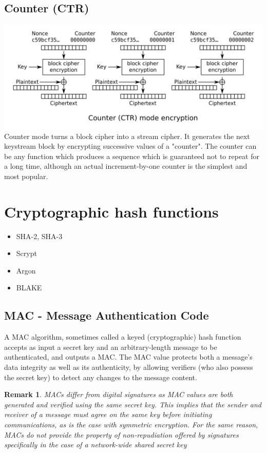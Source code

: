 \documentclass[10pt,a4paper]{article}
\newtheorem{remark}{Remark}
\begin{document}
\subsection{Counter (CTR)}
\includegraphics[scale=0.2]{img/CTR.png}
\newline 
Counter mode turns a block cipher into a stream cipher. It generates the next keystream block by encrypting successive values of a "counter". The counter can be any function which produces a sequence which is guaranteed not to repeat for a long time, although an actual increment-by-one counter is the simplest and most popular.
\newpage
\section{Cryptographic hash functions}
\begin{itemize}
\item SHA-2, SHA-3
\item Scrypt
\item Argon
\item BLAKE
\end{itemize}
\subsection{MAC - Message Authentication Code}
A MAC algorithm, sometimes called a keyed (cryptographic) hash function accepts as input a secret key and an arbitrary-length message to be authenticated, and outputs a MAC. The MAC value protects both a message's data integrity as well as its authenticity, by allowing verifiers (who also possess the secret key) to detect any changes to the message content.
\begin{remark}
MACs differ from digital signatures as MAC values are both generated and verified using the same secret key. This implies that the sender and receiver of a message must agree on the same key before initiating communications, as is the case with symmetric encryption. For the same reason, MACs do not provide the property of non-repudiation offered by signatures specifically in the case of a network-wide shared secret key
\end{remark}
\end{document}
